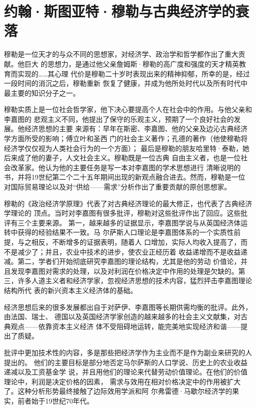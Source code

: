 \chapter{约翰·斯图亚特·穆勒与古典经济学的衰落}

穆勒是一位天才的与众不同的思想家，对经济学、政治学和哲学都作出了重大贡献。他巨大
的思想力，是通过他父亲詹姆斯·穆勒的高广度和强度的天才精英教育而实现的……其心理
代价是穆勒二十岁时表现出来的精神抑郁，所幸的是，经过一段时间的消沉之后，穆勒重新
恢复了健康，并成为他所处时代以及所有时代中最主要的知识分子之一。

穆勒实质上是一位社会哲学家，他下决心要提高个人在社会中的作用。与他父亲和李嘉图的
悲观主义不同，他提出了保守的乐观主义，预期了一个良好社会的发展。他经济思想的主要
来源有：早年在斯密、李嘉图、他的父亲及边沁古典经济学方面所受的影响；傅立叶和圣西
门的社会主义著作；孔德的著作（他使穆勒将经济学仅仅视为人类社会行为的一个方面）；
最后是穆勒的朋友哈里特·泰勒，她后来成了他的妻子，人文社会主义。穆勒既是一位古典
自由主义者，也是一位社会改革家。他认为他的主要任务是写一本对李嘉图的学术思想进行
清晰说明的书，并将19世纪第二个二十五年期间出现的新观点融合进去。然而，穆勒是一位
对国际贸易理论以及对“供给——需求”分析作出了重要贡献的原创思想家。

穆勒的《政治经济学原理》代表了对古典经济理论的最大修正，也代表了古典经济学理论的
顶点。当时对李嘉图有很多批评，穆勒对这些批评作出了回应。这些批评有三个主要来源。
第一，越来越多的证据显示，李嘉图学说与从英国经济体运转中获得的经验结果不一致。马
尔萨斯人口理论是李嘉图体系的一个实质性前提，与之相反，不断增多的证据表明，随着人
口增加，实际人均收入提高了，而不是减少了；并且，农业中技术的进步，使农业正经历着
收益递增而不是收益递减。第二，学者们开始彻底研究李嘉图的理论结构，尤其是他的劳动
价值论，并且发现李嘉图对需求的处理，以及对利润在价格决定中作用的处理是欠缺的。第
三，许多人道主义者和经济学家，忽视经济思想的技术内容，猛烈抨击李嘉图理论结构所代
表的新兴资本主义经济体的基础。

经济思想后来的很多发展都出自于对萨伊、李嘉图等长期供需均衡的批评。此外，由法国、瑞士、
德国以及英国经济学家创造的越来越多的社会主义文献集，对古典观点——依靠资本主义经济
体不受阻碍地运转，能完美地实现经济和谐——提出了质疑。

批评中更加技术性的内容，多是那些把经济学作为主业而不是作为副业来研究的人提出的。
他们的主要目标是部分地否定马尔萨斯的人口学说、历史上的农业收益递减以及工资基金学
说，并且用他们的理论来代替劳动价值理论。在他们的价值理论中，利润是决定价格的因素，
需求与效用在相对价格决定中的作用被扩大了。这种分析形势最终接触了边际效用学派和阿
尔弗雷德·马歇尔经济学的果实，前者始于19世纪70年代。

